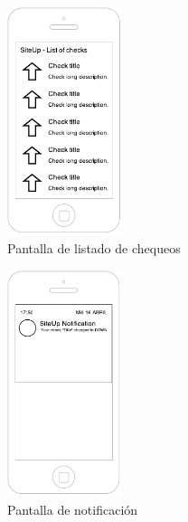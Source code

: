 \begin{figure}[htbp]
  \centering
  \includegraphics[width=0.3\textwidth]{4_analisis/android_list}
  \caption{Pantalla de listado de chequeos}
  \label{fig:alist}
\end{figure}

\begin{figure}[htbp]
  \centering
  \includegraphics[width=0.3\textwidth]{4_analisis/android_notification}
  \caption{Pantalla de notificación}
  \label{fig:anotify}
\end{figure}


